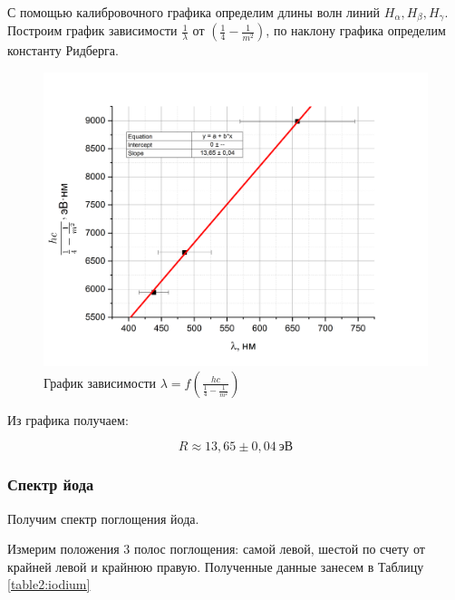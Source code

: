 \documentclass[a4paper,12pt]{article}
\begin{document}
\pagebreak

С помощью калибровочного графика определим длины волн линий $H_{\alpha}, H_{\beta}, H_{\gamma}$. Построим график зависимости $\frac{1}{\lambda}$ от  $\left( \frac{1}{4} - \frac{1}{m^2} \right)$, по наклону графика определим константу Ридберга.

\begin{figure}[h!]
	\centering
	\includegraphics[width=\linewidth]{Hydrogen}
	\caption{График зависимости $\lambda = f \left(\frac{hc}{\frac{1}{4} - \frac{1}{m^2}} \right)$}
\end{figure}	

Из графика получаем:

$$
	R \approx 13,65 \pm 0,04 \ эВ
$$

\newpage

\subsubsection*{Спектр йода}

Получим спектр поглощения йода.

Измерим положения 3 полос поглощения: самой левой, шестой по счету от крайней левой и крайнюю правую. Полученные данные занесем в Таблицу \ref{table2:iodium}
\end{document}
